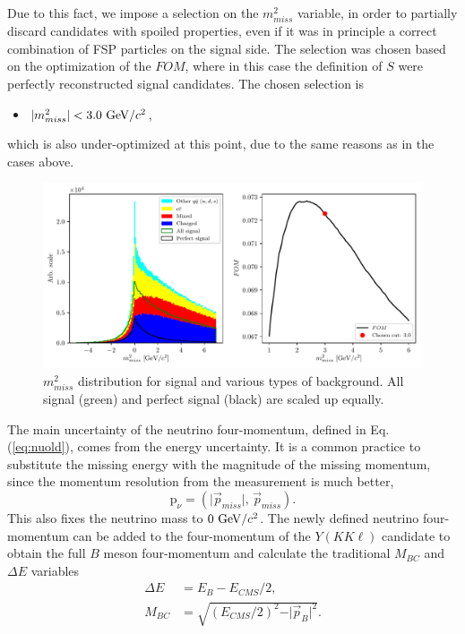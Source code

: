 Due to this fact, we impose a selection on the $m_{miss}^2$ variable, in order to partially discard candidates with spoiled properties, even if it was in principle a correct combination of FSP particles on the signal side. The selection was chosen based on the optimization of the $FOM$, where in this case the definition of $S$ were perfectly reconstructed signal candidates. The chosen selection is 
\begin{itemize}
	\item $\vert m_{miss}^2 \vert < 3.0\mathrm{~GeV}/c^2$,
\end{itemize}
which is also under-optimized at this point, due to the same reasons as in the cases above.


\begin{figure}[H]
	\centering
	\captionsetup{width=.8\linewidth}
	\includegraphics[width=\linewidth]{fig/missM2}
	\caption{$m_{miss}^2$ distribution for signal and various types of background. All signal (green) and perfect signal (black) are scaled up equally.}
	\label{fig:missm2}
\end{figure}

The main uncertainty of the neutrino four-momentum, defined in Eq. (\ref{eq:nuold}), comes from the energy uncertainty. It is a common practice to substitute the missing energy with the magnitude of the missing momentum, since the momentum resolution from the measurement is much better,
\begin{equation}
\label{eq:nunew}
\mathrm{p}_\nu = \left(\vert \vec{p}_{miss} \vert,\,\vec{p}_{miss} \right).
\end{equation}
This also fixes the neutrino mass to $0\mathrm{~GeV}/c^2$. The newly defined neutrino four-momentum can be added to the four-momentum of the $Y(KK\ell)$ candidate to obtain the full $B$ meson four-momentum and calculate the traditional $M_{BC}$ and $\Delta E$ variables
\begin{align}
\label{eq:de}
\Delta E &= E_B - E_{CMS}/2,\\
M_{BC} &= \sqrt{\left(E_{CMS}/2\right)^2 - \vert \vec{p}_B \vert^2}.
\end{align}

